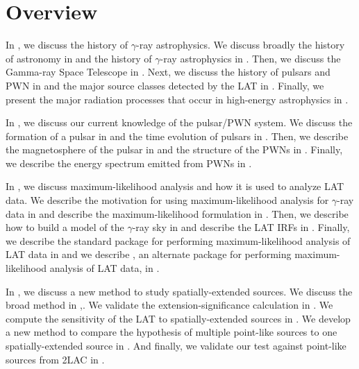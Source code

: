\chapter{Overview}

In , we discuss the history of $\gamma$-ray
astrophysics. We discuss broadly the history of astronomy in
 and the history of $\gamma$-ray
astrophysics in .  Then, we discuss
the \fermi Gamma-ray Space Telescope in .
Next, we discuss the history of pulsars and \ac{PWN} in
 and the major source classes detected by the
\ac{LAT} in .  Finally, we present the
major radiation processes that occur in high-energy astrophysics in
.

In , we discuss our current knowledge of
the pulsar/\ac{PWN} system.  We discuss the formation of a pulsar
in  and the time evolution of pulsars
in .  Then, we describe the magnetosphere of
the pulsar in  and the structure of the
\acp{PWN} in .  Finally, we describe the energy
spectrum emitted from \acp{PWN} in .

In , we discuss maximum-likelihood
analysis and how it is used to analyze \ac{LAT} data.
We describe the motivation for using maximum-likelihood analysis
for $\gamma$-ray data in 
and describe the maximum-likelihood formulation in
.  Then, we describe how to build
a model of the $\gamma$-ray sky in  and describe
the \ac{LAT} \acp{IRF} in .
Finally, 
we describe the standard
package \gtlike for performing maximum-likelihood analysis of \ac{LAT}
data in  and we describe \pointlike,
an alternate package for performing maximum-likelihood analysis of
\ac{LAT} data, in .


In , we discuss a new method
to study spatially-extended sources.  We discuss the broad
method in ,.  We validate the
extension-significance calculation in . We
compute the sensitivity of the \ac{LAT} to spatially-extended sources
in .  We develop a new method to
compare the hypothesis of multiple point-like sources to one
spatially-extended source in .
And finally, we validate our test against point-like sources from \ac{2LAC}
in .

